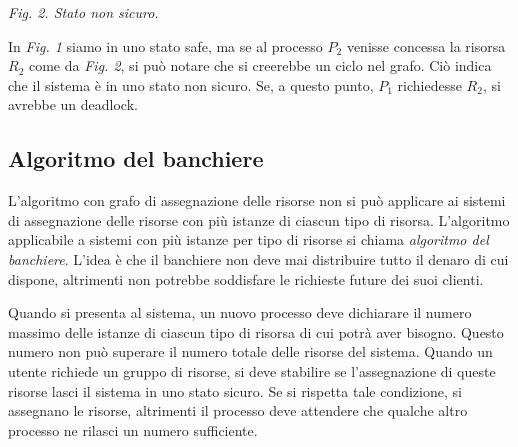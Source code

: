 \documentclass[a4paper,12pt, twoside]{report}
\begin{document}
\begin{multicols}{2}
\begin{center}
\end{center}
\emph{Fig. 2. Stato non sicuro.}
\end{multicols}

In \emph{Fig. 1} siamo in uno stato safe, ma se al processo $P_2$ venisse concessa la risorsa $R_2$ come da \emph{Fig. 2}, si pu\`o notare che si creerebbe un ciclo nel grafo. Ci\`o indica che il sistema \`e in uno stato non sicuro. Se, a questo punto, $P_1$ richiedesse $R_2$, si avrebbe un deadlock.

\subsection{Algoritmo del banchiere}

L'algoritmo con grafo di assegnazione delle risorse non si pu\`o applicare ai sistemi di assegnazione delle risorse con pi\`u istanze di ciascun tipo di risorsa. L'algoritmo applicabile a sistemi con pi\`u istanze per tipo di risorse si chiama \emph{algoritmo del banchiere}. L'idea \`e che il banchiere non deve mai distribuire tutto il denaro di cui dispone, altrimenti non potrebbe soddisfare le richieste future dei suoi clienti.

Quando si presenta al sistema, un nuovo processo deve dichiarare il numero massimo delle istanze di ciascun tipo di risorsa di cui potr\`a aver bisogno. Questo numero non pu\`o superare il numero totale delle risorse del sistema. Quando un utente richiede un gruppo di risorse, si deve stabilire se l'assegnazione di queste risorse lasci il sistema in uno stato sicuro. Se si rispetta tale condizione, si assegnano le risorse, altrimenti il processo deve attendere che qualche altro processo ne rilasci un numero sufficiente.
\end{document}
